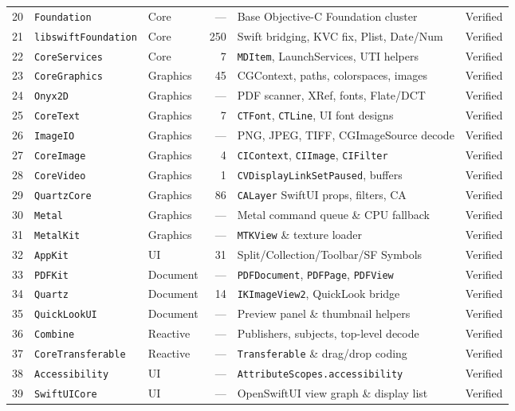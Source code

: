 \documentclass[10pt,twocolumn,letterpaper]{article}
\begin{document}
{\begin{longtable}{@{}r l l r l l@{}}
20 & \texttt{Foundation} & Core & --- & Base Objective-C Foundation cluster & Verified \\
21 & \texttt{libswiftFoundation} & Core & 250 & Swift bridging, KVC fix, Plist, Date/Num & Verified \\
22 & \texttt{CoreServices} & Core & 7 & \texttt{MDItem}, LaunchServices, UTI helpers & Verified \\
23 & \texttt{CoreGraphics} & Graphics & 45 & CGContext, paths, colorspaces, images & Verified \\
24 & \texttt{Onyx2D} & Graphics & --- & PDF scanner, XRef, fonts, Flate/DCT & Verified \\
25 & \texttt{CoreText} & Graphics & 7 & \texttt{CTFont}, \texttt{CTLine}, UI font designs & Verified \\
26 & \texttt{ImageIO} & Graphics & --- & PNG, JPEG, TIFF, CGImageSource decode & Verified \\
27 & \texttt{CoreImage} & Graphics & 4 & \texttt{CIContext}, \texttt{CIImage}, \texttt{CIFilter} & Verified \\
28 & \texttt{CoreVideo} & Graphics & 1 & \texttt{CVDisplayLinkSetPaused}, buffers & Verified \\
29 & \texttt{QuartzCore} & Graphics & 86 & \texttt{CALayer} SwiftUI props, filters, CA & Verified \\
30 & \texttt{Metal} & Graphics & --- & Metal command queue \& CPU fallback & Verified \\
31 & \texttt{MetalKit} & Graphics & --- & \texttt{MTKView} \& texture loader & Verified \\
32 & \texttt{AppKit} & UI & 31 & Split/Collection/Toolbar/SF Symbols & Verified \\
33 & \texttt{PDFKit} & Document & --- & \texttt{PDFDocument}, \texttt{PDFPage}, \texttt{PDFView} & Verified \\
34 & \texttt{Quartz} & Document & 14 & \texttt{IKImageView2}, QuickLook bridge & Verified \\
35 & \texttt{QuickLookUI} & Document & --- & Preview panel \& thumbnail helpers & Verified \\
36 & \texttt{Combine} & Reactive & --- & Publishers, subjects, top-level decode & Verified \\
37 & \texttt{CoreTransferable} & Reactive & --- & \texttt{Transferable} \& drag/drop coding & Verified \\
38 & \texttt{Accessibility} & UI & --- & \texttt{AttributeScopes.accessibility} & Verified \\
39 & \texttt{SwiftUICore} & UI & --- & OpenSwiftUI view graph \& display list & Verified \\

\end{longtable}}
\end{document}

